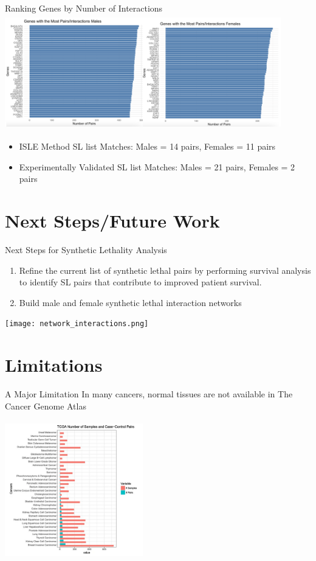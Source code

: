 \documentclass{beamer}
\begin{document}
	\begin{frame}{Ranking Genes by Number of Interactions}
		\includegraphics[width=12cm, height=5cm]{interactions.png}
		
		\begin{itemize}
		\item ISLE Method SL list Matches: Males = 14 pairs, Females = 11 pairs
		\item Experimentally Validated SL list Matches: Males = 21 pairs, Females = 2 pairs
		\end{itemize}
	\end{frame}

	\section{Next Steps/Future Work}
	\begin{frame}{Next Steps for Synthetic Lethality Analysis}
		\begin{enumerate}
			\item Refine the current list of synthetic lethal pairs by performing survival analysis to identify SL pairs that contribute to improved patient survival.
			\item Build male and female synthetic lethal interaction networks	
		\end{enumerate}
	\texttt{[image: network\_interactions.png]}
	\end{frame}

	\section{Limitations}
	\begin{frame}{A Major Limitation}
		In many cancers, normal tissues are not available in The Cancer Genome Atlas	
		\begin{center}
			\includegraphics[width=6cm, height=6cm]{lack.png}
		\end{center}
	\end{frame}
\end{document}
